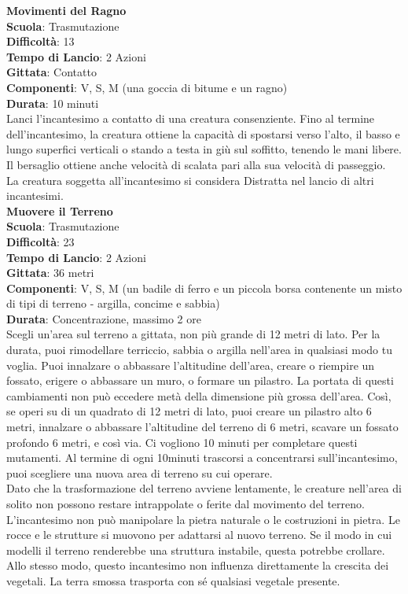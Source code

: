 \begin{multicols}{2}
\medskip\textbf{Movimenti del Ragno}\\
\textbf{Scuola}: Trasmutazione\\
\textbf{Difficoltà}: 13\\
\textbf{Tempo di Lancio}: 2 Azioni\\
\textbf{Gittata}: Contatto\\
\textbf{Componenti}: V, S, M (una goccia di bitume e un ragno)\\
\textbf{Durata}: 10 minuti \\
Lanci l'incantesimo a contatto di una creatura consenziente. Fino al termine dell'incantesimo, la creatura ottiene la capacità di spostarsi verso l'alto, il basso e lungo superfici verticali o stando a testa in giù sul soffitto, tenendo le mani libere. Il bersaglio ottiene anche velocità di scalata pari alla sua velocità di passeggio.\\
La creatura soggetta all'incantesimo si considera Distratta nel lancio di altri incantesimi.\\

\medskip\textbf{Muovere il Terreno}\\
\textbf{Scuola}: Trasmutazione\\
\textbf{Difficoltà}: 23\\
\textbf{Tempo di Lancio}: 2 Azioni\\
\textbf{Gittata}: 36 metri\\
\textbf{Componenti}: V, S, M (un badile di ferro e un piccola borsa contenente un misto di tipi di terreno - argilla, concime e sabbia)\\
\textbf{Durata}: Concentrazione, massimo 2 ore\\
Scegli un'area sul terreno a gittata, non più grande di 12 metri di lato. Per la durata, puoi rimodellare terriccio, sabbia o argilla nell'area in qualsiasi modo tu voglia. Puoi innalzare o abbassare l'altitudine dell'area, creare o riempire un fossato, erigere o abbassare un muro, o formare un pilastro. La portata di questi cambiamenti non può eccedere metà della dimensione più grossa dell'area. Così, se operi su di un quadrato di 12 metri di lato, puoi creare un pilastro alto 6 metri, innalzare o abbassare l'altitudine del terreno di 6 metri, scavare un fossato profondo 6 metri, e così via. Ci vogliono 10 minuti per completare questi mutamenti. Al termine di ogni 10minuti trascorsi a concentrarsi sull'incantesimo, puoi scegliere una nuova area di terreno su cui operare.\\
Dato che la trasformazione del terreno avviene lentamente, le creature nell'area di solito non possono restare intrappolate o ferite dal movimento del terreno. L'incantesimo non può manipolare la pietra naturale o le costruzioni in pietra. Le rocce e le strutture si muovono per adattarsi al nuovo terreno. Se il modo in cui modelli il terreno renderebbe una struttura instabile, questa potrebbe crollare. Allo stesso modo, questo incantesimo non influenza direttamente la crescita dei vegetali. La terra smossa trasporta con sé qualsiasi vegetale presente.


\end{multicols}
